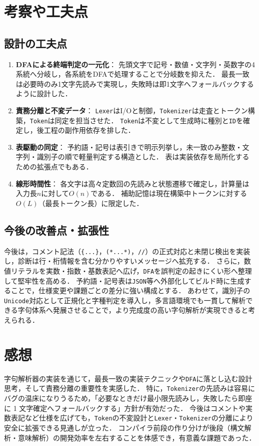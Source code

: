 \documentclass[a4j,10pt]{jarticle}
\begin{document}



\section{考察や工夫点}

\subsection{設計の工夫点}
\begin{enumerate}
  \item \textbf{DFAによる終端判定の一元化}：
  先頭文字で記号・数値・文字列・英数字の4系統へ分岐し，各系統をDFAで処理することで分岐数を抑えた．
  最長一致は必要時のみ1文字先読みで実現し，失敗時は即1文字へフォールバックするように設計した．
  \item \textbf{責務分離と不変データ}：
  \verb|Lexer|はI/Oと制御，\verb|Tokenizer|は走査とトークン構築，\verb|Token|は同定を担当させた．
  \verb|Token|は不変として生成時に種別と\verb|ID|を確定し，後工程の副作用依存を排した．
  \item \textbf{表駆動の同定}：
  予約語・記号は表引きで明示列挙し，未一致のみ整数・文字列・識別子の順で軽量判定する構造とした．
  表は実装依存を局所化するための拡張点でもある．
  \item \textbf{線形時間性}：
  各文字は高々定数回の先読みと状態遷移で確定し，計算量は入力長$n$に対して$O(n)$である．
  補助記憶は現在構築中トークンに対する$O(L)$（最長トークン長）に限定した．
\end{enumerate}

\subsection{今後の改善点・拡張性}
今後は，コメント記法（\verb|{...}|，\verb|(*...*)|，\verb|//|）の正式対応と未閉じ検出を実装し，診断は行・桁情報を含む分かりやすいメッセージへ拡充する．
さらに，数値リテラルを実数・指数・基数表記へ広げ，\verb|DFA|を誤判定の起きにくい形へ整理して堅牢性を高める．
予約語・記号表は\verb|JSON|等へ外部化してビルド時に生成することで，仕様変更や課題ごとの差分に強い構成とする．
あわせて，識別子の\verb|Unicode|対応として正規化と字種判定を導入し，多言語環境でも一貫して解析できる字句体系へ発展させることで，より完成度の高い字句解析が実現できると考えられる．





\section{感想}
字句解析器の実装を通じて，最長一致の実装テクニックや\verb|DFA|に落とし込む設計思考，そして責務分離の重要性を実感した．
特に，\verb|Tokenizer|の先読みは容易にバグの温床になりうるため，「必要なときだけ最小限先読みし，失敗したら即座に 1 文字確定へフォールバックする」方針が有効だった．
今後はコメントや実数表記など仕様を広げても，\verb|Token|の不変設計と\verb|Lexer|・\verb|Tokenizer|の分離により安全に拡張できる見通しが立った．
コンパイラ前段の作り分けが後段（構文解析・意味解析）の開発効率を左右することを体感でき，有意義な課題であった．
\end{document}
